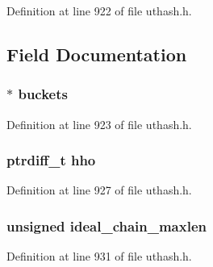 Definition at line 922 of file uthash.\+h.



\subsection{Field Documentation}
\subsubsection[{\texorpdfstring{buckets}{buckets}}]{$\ast$ buckets}\hypertarget{struct_u_t__hash__table_ab8166e712e5eff3106991bec13d9ab20}{}\label{struct_u_t__hash__table_ab8166e712e5eff3106991bec13d9ab20}


Definition at line 923 of file uthash.\+h.

\subsubsection[{\texorpdfstring{hho}{hho}}]{\setlength{\rightskip}{0pt plus 5cm}ptrdiff\+\_\+t hho}\hypertarget{struct_u_t__hash__table_af7a888099092eb93f240f1b2bfcc2708}{}\label{struct_u_t__hash__table_af7a888099092eb93f240f1b2bfcc2708}


Definition at line 927 of file uthash.\+h.

\subsubsection[{\texorpdfstring{ideal\+\_\+chain\+\_\+maxlen}{ideal_chain_maxlen}}]{\setlength{\rightskip}{0pt plus 5cm}unsigned ideal\+\_\+chain\+\_\+maxlen}\hypertarget{struct_u_t__hash__table_a0eed5348057e127cdc2fe87bc635a7ac}{}\label{struct_u_t__hash__table_a0eed5348057e127cdc2fe87bc635a7ac}


Definition at line 931 of file uthash.\+h.


